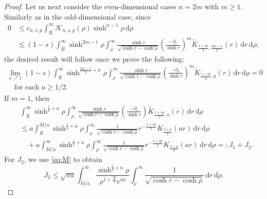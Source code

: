 \documentclass[11pt]{amsart}
\theoremstyle{plain}
\theoremstyle{definition}
\numberwithin{equation}{section}
\begin{document}
\begin{proof}
Let us next consider the even-dimensional cases $n=2m$ with $m \geq 1$. Similarly as in the odd-dimensional case, since
\begin{equation*}
\begin{split}
0
&\leq c_{n, s, p} \int_{R}^{\infty} \mathcal{K}_{n,s,p}(\rho)\sinh^{n-1} \rho \,\mathrm{d}\rho \\
&\lesssim (1-s) \int_{R}^{\infty} \sinh^{2m-1} \rho \int_{\rho}^{\infty} \frac{\sinh r}{\sqrt{\cosh r - \cosh \rho}} \left( \frac{-\partial_{r}}{\sinh r} \right)^{m} \widetilde{K}_{\frac{1+sp}{2}, \frac{2m-1}{2}}(r) \,\mathrm{d}r \,\mathrm{d}\rho,
\end{split}
\end{equation*}
the desired result will follow once we prove the following:
\begin{equation} \label{eq:infty-even}
\begin{split}
\lim_{s \nearrow 1} (1-s) \int_{R}^{\infty} \sinh^{\frac{2m-1}{2}+a}\rho \int_{\rho}^{\infty} \frac{\sinh r}{\sqrt{\cosh r - \cosh \rho}} \left( \frac{-\partial_r}{\sinh r} \right)^{m} \widetilde{K}_{\frac{1+sp}{2},a}(r) \, \mathrm{d}r \,\mathrm{d}\rho = 0 \\
\quad\text{for each } a \geq 1/2.
\end{split}
\end{equation}
If $m=1$, then
\begin{equation*}
\begin{split}
&\int_{R}^{\infty} \sinh^{\frac{1}{2}+a}\rho \int_{\rho}^{\infty} \frac{\sinh r}{\sqrt{\cosh r - \cosh \rho}} \left( \frac{-\partial_{r}}{\sinh r} \right) \widetilde{K}_{\frac{1+sp}{2},a}(r) \,\mathrm{d}r \,\mathrm{d}\rho \\
&\leq a \int_{R}^{M/a} \sinh^{\frac{1}{2}+a}\rho \int_{\rho}^{\infty} \frac{1}{\sqrt{\cosh r - \cosh \rho}} r^{-\frac{1+sp}{2}} K_{\frac{3+p}{2}}(ar) \,\mathrm{d}r \,\mathrm{d}\rho \\
&\quad + a \int_{M/a}^{\infty} \sinh^{\frac{1}{2}+a}\rho \int_{\rho}^{\infty} \frac{1}{\sqrt{\cosh r - \cosh \rho}} r^{-\frac{1+sp}{2}} K_{\frac{3+p}{2}}(ar) \,\mathrm{d}r \,\mathrm{d}\rho =: J_{1} + J_{2}.
\end{split}
\end{equation*}
For $J_{2}$, we use \eqref{eq:M} to obtain
\begin{equation*}
J_{2} \leq \sqrt{\pi a} \int_{M/a}^{\infty} \frac{\sinh^{\frac{1}{2}+a}\rho}{\rho^{1+\frac{sp}{2}} e^{a\rho}} \int_{\rho}^{\infty} \frac{1}{\sqrt{\cosh r - \cosh \rho}} \,\mathrm{d}r \,\mathrm{d}\rho.
\end{equation*}

\end{proof}
\end{document}
